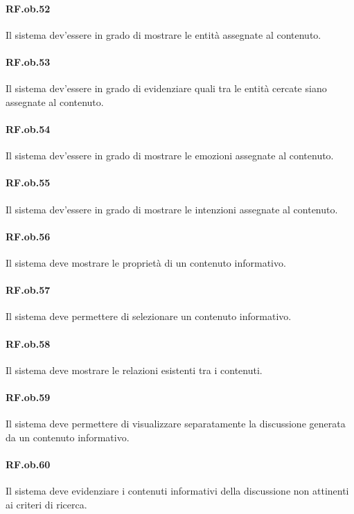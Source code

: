 \documentclass[10pt,a4paper,headinclude,footinclude,hidelinks]{scrreprt} %
\begin{document}
	\paragraph{RF.ob.52} Il sistema dev'essere in grado di mostrare le entità assegnate al contenuto.

	\paragraph{RF.ob.53} Il sistema dev'essere in grado di evidenziare quali tra le entità cercate siano assegnate al contenuto.

	\paragraph{RF.ob.54} Il sistema dev'essere in grado di mostrare le emozioni assegnate al contenuto.

	\paragraph{RF.ob.55} Il sistema dev'essere in grado di mostrare le intenzioni assegnate al contenuto.

	\paragraph{RF.ob.56} Il sistema deve mostrare le proprietà di un contenuto informativo.

	\paragraph{RF.ob.57} Il sistema deve permettere di selezionare un contenuto informativo.

	\paragraph{RF.ob.58} Il sistema deve mostrare le relazioni esistenti tra i contenuti.

	\paragraph{RF.ob.59} Il sistema deve permettere di visualizzare separatamente la discussione generata da un contenuto informativo.

	\paragraph{RF.ob.60} Il sistema deve evidenziare i contenuti informativi della discussione non attinenti ai criteri di ricerca.
\end{document}
